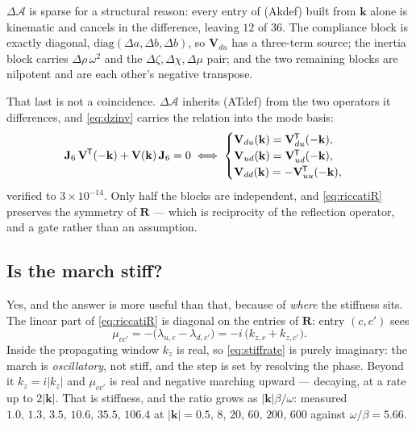 \documentclass[11pt,a4paper]{article}
\newcommand{\bV}{\mathbf{V}}
\newcommand{\dA}{\Delta\mathcal{A}}
\newcommand{\Jsix}{\mathbf{J}_{6}}
\newcommand{\tp}{^{\mkern-1.5mu\mathsf{T}}}
\newcommand{\bR}{\mathbf{R}}
\begin{document}
$\dA$ is sparse for a structural reason: every entry of (Akdef) built from
$\mathbf{k}$ alone is kinematic and cancels in the difference, leaving $12$ of
$36$.  The compliance block is exactly diagonal,
$\mathrm{diag}(\Delta a,\Delta b,\Delta b)$, so $\bV_{du}$ has a three-term
source; the inertia block carries $\Delta\rho\,\omega^2$ and the
$\Delta\zeta,\Delta\chi,\Delta\mu$ pair; and the two remaining blocks are
nilpotent and are each other's negative transpose.

That last is not a coincidence.  $\dA$ inherits (ATdef) from the two operators it
differences, and \eqref{eq:dzinv} carries the relation into the mode basis:
\begin{equation}\label{eq:vham}
  \Jsix\,\bV\tp(-\mathbf{k}) + \bV(\mathbf{k})\,\Jsix = 0
  \iff
  \begin{cases}
    \bV_{du}(\mathbf{k}) = \bV_{du}\tp(-\mathbf{k}),\\
    \bV_{ud}(\mathbf{k}) = \bV_{ud}\tp(-\mathbf{k}),\\
    \bV_{dd}(\mathbf{k}) = -\bV_{uu}\tp(-\mathbf{k}),
  \end{cases}
\end{equation}
verified to $3\times10^{-14}$.  Only half the blocks are independent, and
\eqref{eq:riccatiR} preserves the symmetry of $\bR$ --- which is reciprocity of
the reflection operator, and a gate rather than an assumption.

\subsection{Is the march stiff?}\label{sec:stiff}

Yes, and the answer is more useful than that, because of \emph{where} the
stiffness sits.  The linear part of \eqref{eq:riccatiR} is diagonal on the
entries of $\bR$: entry $(c,c')$ sees
\begin{equation}\label{eq:stiffrate}
  \mu_{cc'} = -\bigl(\lambda_{u,c} - \lambda_{d,c'}\bigr)
            = -i\,\bigl(k_{z,c} + k_{z,c'}\bigr).
\end{equation}
Inside the propagating window $k_z$ is real, so \eqref{eq:stiffrate} is purely
imaginary: the march is \emph{oscillatory}, not stiff, and the step is set by
resolving the phase.  Beyond it $k_z = i|k_z|$ and $\mu_{cc'}$ is real and
negative marching upward --- decaying, at a rate up to $2|\mathbf{k}|$.  That is
stiffness, and the ratio grows as $|\mathbf{k}|\beta/\omega$: measured
$1.0,\,1.3,\,3.5,\,10.6,\,35.5,\,106.4$ at
$|\mathbf{k}| = 0.5,\,8,\,20,\,60,\,200,\,600$ against
$\omega/\beta = 5.66$.
\end{document}
